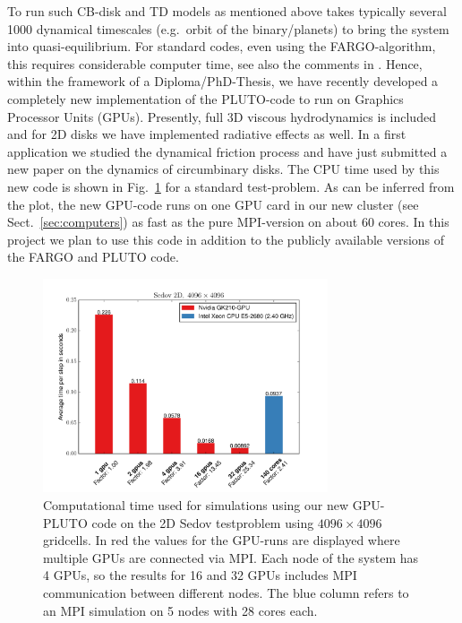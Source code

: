 \documentclass[10pt,fleqn,twoside]{article}
\begin{document}
To run such CB-disk and TD models as mentioned above \citep{2013A&A...560A..40M}
takes typically several 1000 dynamical timescales (e.g.\ orbit of the binary/planets) to bring the system
into quasi-equilibrium. For standard codes, even using the FARGO-algorithm, this requires considerable
computer time, see also the comments in \citet{2011ApJ...729...47Z}. Hence, within the
framework of a Diploma/PhD-Thesis, we have recently
developed a completely new implementation of the PLUTO-code to run on Graphics Processor Units (GPUs).
Presently, full 3D viscous hydrodynamics is included and for 2D disks we have implemented
radiative effects as well. In a first application we studied the dynamical friction process
\citep{2016A&A...589A..10T} and have just submitted a new paper on the dynamics of circumbinary disks.
The CPU time used by this new code is shown in Fig.~\ref{fig:cpu} for a standard test-problem.
As can be inferred from the plot, the new GPU-code runs on one GPU card in our new cluster (see Sect.~\ref{sec:computers})
as fast as the pure MPI-version on about 60 cores.
In this project we plan to use this code in addition to the publicly available versions of the FARGO and PLUTO code.

\begin{figure}[t]
\centerline{\includegraphics[width=0.75\textwidth]{pics/sedov2d_scaling.pdf}}
\caption{\label{fig:cpu} Computational time used for simulations using our new GPU-PLUTO code
on the 2D Sedov testproblem using $4096 \times 4096$ gridcells.
In red the values for the GPU-runs are displayed where multiple GPUs are connected via
MPI. Each node of the system has 4 GPUs, so the results for 16 and 32 GPUs includes MPI communication
between different nodes. The blue column refers to an MPI simulation on 5 nodes with 28 cores each.
} 
\end{figure}
%
\end{document}
